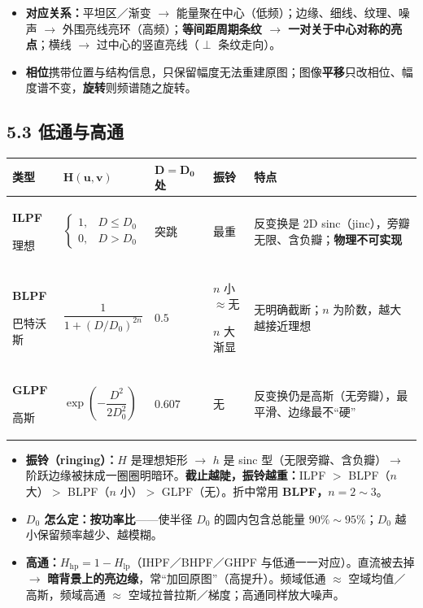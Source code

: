\begin{itemize}
\item \textbf{对应关系：}平坦区／渐变 $\to$ 能量聚在中心（低频）；边缘、细线、纹理、噪声 $\to$ 外围亮线亮环（高频）；\textbf{等间距周期条纹 $\to$ 一对关于中心对称的亮点}；横线 $\to$ 过中心的竖直亮线（$\perp$ 条纹走向）。
\item \textbf{相位}携带位置与结构信息，只保留幅度无法重建原图；图像\textbf{平移}只改相位、幅度谱不变，\textbf{旋转}则频谱随之旋转。
\end{itemize}

\subsection*{5.3 低通与高通}
\begingroup\small
\renewcommand{\arraystretch}{1.3}
\begin{tabularx}{\linewidth}{@{}p{.10\linewidth}p{.25\linewidth}p{.10\linewidth}p{.10\linewidth}X@{}}
\toprule
\textbf{类型} & $\boldsymbol{H(u,v)}$ & $\boldsymbol{D=D_0}$ \textbf{处} & \textbf{振铃} & \textbf{特点} \\
\midrule
\textbf{ILPF}\par 理想 & $\begin{cases}1,&D\le D_0\\0,&D>D_0\end{cases}$ & 突跳 & 最重 & 反变换是 2D sinc（jinc），旁瓣无限、含负瓣；\textbf{物理不可实现} \\
\textbf{BLPF}\par 巴特沃斯 & $\dfrac{1}{1+(D/D_0)^{2n}}$ & $0.5$ & $n$ 小$\approx$无\par $n$ 大渐显 & 无明确截断；$n$ 为阶数，越大越接近理想 \\
\textbf{GLPF}\par 高斯 & $\exp\!\left(-\dfrac{D^2}{2D_0^2}\right)$ & $0.607$ & 无 & 反变换仍是高斯（无旁瓣），最平滑、边缘最不“硬” \\
\bottomrule
\end{tabularx}
\endgroup
\begin{itemize}
\item \textbf{振铃（ringing）：}$H$ 是理想矩形 $\to$ $h$ 是 sinc 型（无限旁瓣、含负瓣）$\to$ 阶跃边缘被抹成一圈圈明暗环。\textbf{截止越陡，振铃越重：}ILPF $>$ BLPF（$n$ 大）$>$ BLPF（$n$ 小）$>$ GLPF（无）。折中常用 \textbf{BLPF，$n=2\sim3$}。
\item \textbf{$D_0$ 怎么定：按功率比}——使半径 $D_0$ 的圆内包含总能量 \textbf{$90\%\sim95\%$}；$D_0$ 越小保留频率越少、越模糊。
\item \textbf{高通：}$H_{\mathrm{hp}}=1-H_{\mathrm{lp}}$（IHPF／BHPF／GHPF 与低通一一对应）。直流被去掉 $\to$ \textbf{暗背景上的亮边缘}，常“加回原图”（高提升）。频域低通 $\approx$ 空域均值／高斯，频域高通 $\approx$ 空域拉普拉斯／梯度；高通同样放大噪声。
\end{itemize}

